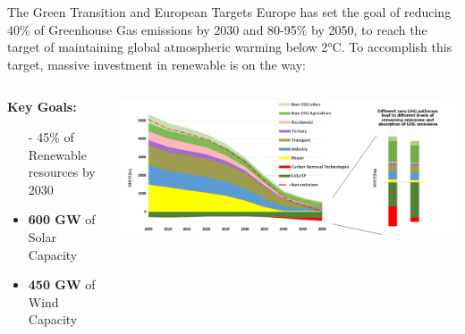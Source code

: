 \documentclass[aspectratio=169,hyperref={pdfpagelabels=false}]{beamer}
\begin{document}
    \begin{frame}{\Large{The Green Transition and European Targets}}
    Europe has set the goal of reducing 40\% of Greenhouse Gas emissions by 2030 and 80-95\% by 2050, to reach the target of maintaining global atmospheric warming below 2°\;C. 
    To accomplish this target, massive investment in renewable is on the way:

    \vspace*{1em}

        \begin{columns}
          \begin{column}{0.4\textwidth}
            \textbf{Key Goals: }
            \begin{itemize}
                \item[-] 45\% of Renewable resources by 2030
            \end{itemize}
            \begin{itemize}
                \item \textbf{600 GW} of Solar Capacity
                \item \textbf{450 GW} of Wind Capacity
            \end{itemize}
            
          \end{column}
      
          \begin{column}{0.7\textwidth}
            \includegraphics[width=\textwidth]{img/pic1.png} %
          \end{column}
        \end{columns}
        \let\thefootnote\relax{}
      \end{frame}
\end{document}
